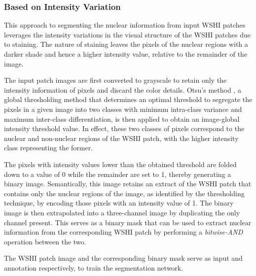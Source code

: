 \documentclass{comjnl}
\begin{document}
\subsubsection{Based on Intensity Variation}

This approach to segmenting the nuclear information from input WSHI patches leverages the intensity variations in the visual structure of the WSHI patches due to staining. The nature of staining leaves the pixels of the nuclear regions with a darker shade and hence a higher intensity value, relative to the remainder of the image.

The input patch images are first converted to grayscale to retain only the intensity information of pixels \cite{hui_liu} and discard the color details. Otsu's method \cite{otsu}, a global thresholding method that determines an optimal threshold to segregate the pixels in a given image into two classes with minimum intra-class variance and maximum inter-class differentiation, is then applied to obtain an image-global intensity threshold value. In effect, these two classes of pixels correspond to the nuclear and non-nuclear regions of the WSHI patch, with the higher intensity class representing the former.

The pixels with intensity values lower than the obtained threshold are folded down to a value of 0 while the remainder are set to 1, thereby generating a binary image. Semantically, this image retains an extract of the WSHI patch that contains only the nuclear regions of the image, as identified by the thresholding technique, by encoding those pixels with an intensity value of 1. The binary image is then extrapolated into a three-channel image by duplicating the only channel present. This serves as a binary mask that can be used to extract nuclear information from the corresponding WSHI patch by performing a \emph{bitwise-AND} operation between the two.

The WSHI patch image and the corresponding binary mask serve as input and annotation respectively, to train the segmentation network. 
\end{document}
